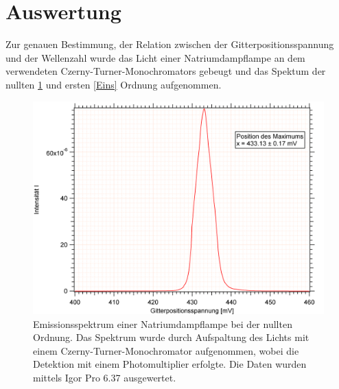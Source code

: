 %
%

\section {Auswertung}

Zur genauen Bestimmung, der Relation zwischen der Gitterpositionsspannung und der Wellenzahl wurde das Licht einer Natriumdampflampe an dem verwendeten Czerny-Turner-Monochromators gebeugt und das Spektum der nullten \ref{Null} und ersten \ref{Eins} Ordnung aufgenommen. 


\begin{figure}[H]
	\centering	
	\begin{minipage}{1\textwidth}
	\includegraphics[width=\columnwidth]{Bilder/Graph1.png}
	\end{minipage}
	
	
	\caption{Emissionsspektrum einer Natriumdampflampe bei der nullten Ordnung. Das Spektrum wurde durch Aufspaltung des Lichts mit einem Czerny-Turner-Monochromator aufgenommen, wobei die Detektion mit einem Photomultiplier erfolgte. Die Daten wurden mittels Igor Pro 6.37 ausgewertet.}
	

	\label{Null}
\end{figure}

